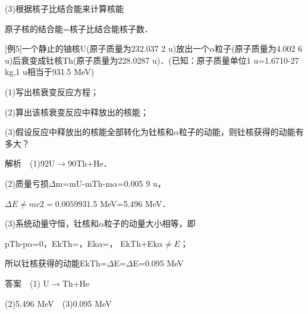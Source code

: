 (3)根据核子比结合能来计算核能

原子核的结合能=核子比结合能核子数．

{[}例5{]}一个静止的铀核U(原子质量为232.037 2
u)放出一个$\alpha$粒子(原子质量为4.002 6 u)后衰变成钍核Th(原子质量为228.0287
u)．(已知：原子质量单位1 u=1.6710-27 kg,1 u相当于931.5 MeV)

(1)写出核衰变反应方程；

(2)算出该核衰变反应中释放出的核能；

(3)假设反应中释放出的核能全部转化为钍核和$\alpha$粒子的动能，则钍核获得的动能有多大？

解析　(1)92U$\rightarrow$90Th+He．

(2)质量亏损$\Delta$m=mU-mTh-m$\alpha$=0.005 9 u，

$\Delta E\neq mc2=0.0059$931.5 MeV=5.496 MeV．

(3)系统动量守恒，钍核和$\alpha$粒子的动量大小相等，即

pTh-p$\alpha$=0，EkTh=，Ek$\alpha$=， EkTh+Ek$\alpha \neq E$；

所以钍核获得的动能EkTh=$\Delta$E=$\Delta$E=0.095 MeV

答案　(1) U$\rightarrow$Th+He

(2)5.496 MeV　(3)0.095 MeV

